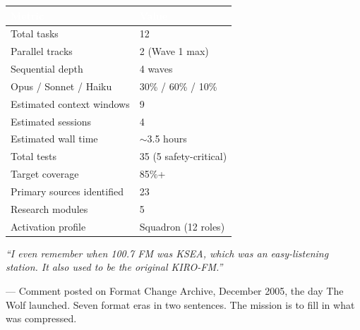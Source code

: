 \documentclass[11pt,letterpaper]{article}
\newcommand{\tableheader}[1]{\textbf{\sffamily\textcolor{white}{#1}}}
\begin{document}
\begin{center}
\begin{tabularx}{\textwidth}{L{6cm}X}
\toprule
{}
\tableheader{Metric} & \tableheader{Value} \\
\midrule
Total tasks & 12 \\
Parallel tracks & 2 (Wave 1 max) \\
Sequential depth & 4 waves \\
Opus / Sonnet / Haiku & 30\% / 60\% / 10\% \\
Estimated context windows & 9 \\
Estimated sessions & 4 \\
Estimated wall time & $\sim$3.5 hours \\
Total tests & 35 (5 safety-critical) \\
Target coverage & 85\%+ \\
Primary sources identified & 23 \\
Research modules & 5 \\
Activation profile & Squadron (12 roles) \\
\bottomrule
\end{tabularx}
\end{center}

\vspace{1.5em}
\begin{quotebox}
\textit{``I even remember when 100.7 FM was KSEA, which was an easy-listening station. It also used to be the original KIRO-FM.''}

\vspace{0.5em}
{\small\sffamily\textcolor{subtlegray}{--- Comment posted on Format Change Archive, December 2005, the day The Wolf launched. Seven format eras in two sentences. The mission is to fill in what was compressed.}}
\end{quotebox}
\end{document}
